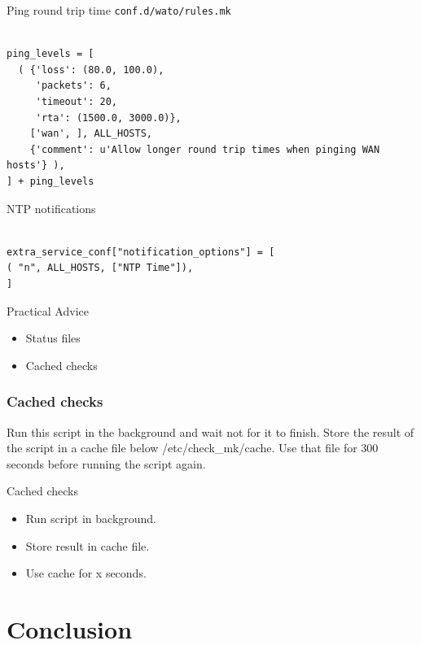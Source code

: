 \begin{frame}[fragile]{Ping round trip time}
\verb|conf.d/wato/rules.mk|
\begin{lstlisting}

ping_levels = [
  ( {'loss': (80.0, 100.0), 
     'packets': 6, 
     'timeout': 20, 
     'rta': (1500.0, 3000.0)}, 
    ['wan', ], ALL_HOSTS, 
    {'comment': u'Allow longer round trip times when pinging WAN hosts'} ),
] + ping_levels

\end{lstlisting}
\end{frame}

\begin{frame}[fragile]{NTP notifications}

\begin{lstlisting}

extra_service_conf["notification_options"] = [
( "n", ALL_HOSTS, ["NTP Time"]),
]

\end{lstlisting}
\end{frame}

\begin{frame}{Practical Advice}
\begin{itemize}
\item Status files
\item Cached checks
\end{itemize}
\end{frame}

\subsubsection{Cached checks}

Run this script in the background and wait not for it to finish.
Store the result of the script in a cache file below /etc/check\_mk/cache.
Use that file for 300 seconds before running the script again.

\begin{frame}{Cached checks}
\begin{itemize}
\item Run script in background.
\item Store result in cache file.
\item Use cache for x seconds.
\end{itemize}
\end{frame}

\section{Conclusion}

